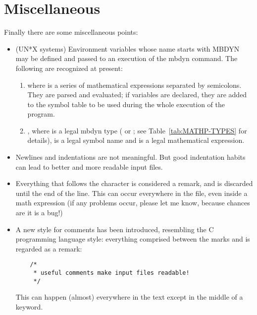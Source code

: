 \section{Miscellaneous}
Finally there are some miscellaneous points:
\begin{itemize}
    \item (UN*X systems) Environment variables whose name starts with MBDYN may
    be defined and passed to an execution of the mbdyn command.
    The following are recognized at present:
  
    \begin{enumerate}
  
        \item {}
	where  is a series of mathematical expressions
	separated by semicolons. 
	They are parsed and evaluated; if variables are declared, they are
	added to the symbol table to be used during the whole execution 
	of the program.
    
        \item {},
	where  is a legal mbdyn type ( or ;
	see Table~\ref{tab:MATHP-TYPES} for details),
	 is a legal symbol name and  is a legal
	mathematical expression.
    
    \end{enumerate}
    
    \item Newlines and indentations are not meaningful. But good indentation
    habits can lead to better and more readable input files.
    
    \item Everything that follows the character  is considered a
    remark, and is discarded until the end of the line. 
    This can occur everywhere in the file, even inside a math expression 
    (if any problems occur, please let me know, because chances are 
    it is a bug!)
    
    \item A new style for comments has been introduced, resembling the 
    C programming language style: everything comprised between the marks
    \kw{/*} and \kw{*/} is regarded as a remark:
\begin{verbatim}
    /*
     * useful comments make input files readable!
     */
\end{verbatim}
    This can happen (almost) everywhere in the text except in the middle 
    of a keyword.
    

\end{itemize}
